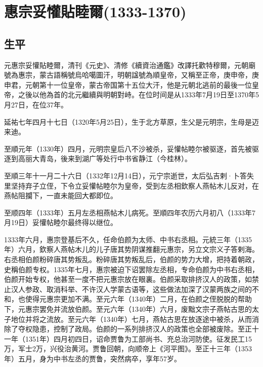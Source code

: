 
\section{惠宗妥懽貼睦爾\tiny(1333-1370)}

\subsection{生平}

元惠宗妥懽貼睦爾，清刊《元史》、清修《續資治通鑑》改譯托歡特穆爾，元朝廟號為惠宗，蒙古語稱號烏哈噶圖汗，明朝諡號為順皇帝，又稱至正帝，庚申帝，庚申君，元朝第十一位皇帝，蒙古帝国第十五位大汗，他是元朝北逃前的最後一位皇帝，之後以他為首的北元繼續與明朝對峙。在位时间是从1333年7月19日至1370年5月27日，在位37年。

延祐七年四月十七日（1320年5月25日），生于北方草原，生父是元明宗，生母是迈来迪。

至順元年（1330年）四月，元明宗皇后八不沙被杀，妥懽帖睦尔被驱逐，首先被驱逐到高丽大青岛，後来到湖广等处行中书省静江（今桂林）。

至順三年十一月二十六日（1332年12月14日），元宁宗逝世，太后弘吉剌·卜答失里坚持弃子立侄，下令立妥懽帖睦尔为皇帝，受到左丞相欽察人燕帖木儿反对，在燕帖阻攔下，一直未能回大都即位。

至顺四年（1333年）五月左丞相燕帖木儿病死。至順四年农历六月初八（1333年7月19日）妥懽帖睦尔最终得以继位。

1333年六月，惠宗登基后不久，任命伯颜为太师、中书右丞相。元統三年（1335年）六月，欽察人燕帖木儿的儿子唐其势阴谋推翻元惠宗，另立文宗义子答剌海。右丞相伯颜粉碎唐其势叛乱。粉碎唐其势叛乱后，伯颜的势力大增，把持着朝政，史稱伯颜专权。1335年七月，惠宗被迫下诏罢除左丞相，专命伯颜为中书右丞相，伯颜开始专权，他甚至一度不把元惠宗放在眼裏。伯颜采取排挤汉人的政策，如禁止汉人参政、取消科举、不许汉人学蒙古语等，这些做法加深了汉蒙两族之间的不和，也使得元惠宗更加不满。至元六年（1340年）二月，在伯颜之侄脱脱的帮助下，元惠宗罢免并流放伯颜。至元六年（1340年）六月，废黜文宗子燕帖古思的太子地位并将之流放。至元六年（1340年）七月，燕帖古思在放逐途中被杀，从而消除了夺权隐患，控制了政局。伯颜的一系列排挤汉人的政策也全部被废除。至正十一年（1351年）四月初四日，诏命贾鲁为工部尚书、充总治河防使。征发民工15万，军士2万，兴役治黄河。贾鲁回朝，向顺帝上《河平图》。至正十三年（1353年）五月，身为中书左丞的贾鲁，突然病卒，享年57岁。


